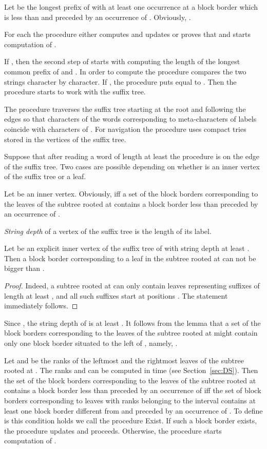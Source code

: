 \documentclass[10pt]{llncs}
\newcommand{\exist}{{\sc Exist}}
\begin{document}
Let  be the longest prefix of  with at least one occurrence at a block border which is less than  and preceded by an occurrence of . Obviously, . 

For each  the procedure  either computes  and updates  or proves that  and starts computation of .

If , then the second step of  starts with computing the length  of the longest common prefix of   and . In order to compute  the procedure compares the two strings character by character. If , the procedure puts  equal to . Then the procedure starts to work with the suffix tree.

The procedure traverses the suffix tree starting at the root and following the edges so that characters of the words corresponding to meta-characters of labels coincide with characters of . For navigation the procedure uses compact tries stored in the vertices of the suffix tree.

Suppose that after reading a word  of length at least  the procedure is on the edge  of the suffix tree. Two cases are possible depending on whether  is an inner vertex of the suffix tree or a leaf.

Let  be an inner vertex. Obviously,  iff a set of the block borders corresponding to the leaves of the subtree rooted at  contains a block border less than  preceded by an occurrence of .

\begin{definition}
  \emph{String depth} of a vertex  of the suffix tree is the length of its label.
\end{definition}

\begin{lemma}
\label{lm:B_v_prop}
 Let  be an explicit inner vertex of the suffix tree of  with string depth at least . Then a block border corresponding to a leaf in the subtree rooted at  can not be bigger than .
\end{lemma}
\begin{proof}
  Indeed, a subtree rooted at  can only contain leaves representing suffixes of length at least , and all such suffixes start at positions . The statement immediately follows.
\end{proof}

Since , the string depth of  is at least . It follows from the lemma that a set of the block borders corresponding to the leaves of the subtree rooted at  might contain only one block border situated to the left of , namely, . 

Let  and  be the ranks of the leftmost and the rightmost leaves of the subtree rooted at . The ranks  and  can be computed in  time (see Section~\ref{sec:DS}). Then the set of the block borders corresponding to the leaves of the subtree rooted at  contains a block border less than  preceded by an occurrence of  iff the set of block borders corresponding to leaves with ranks belonging to the interval  contains at least one block border different from  and preceded by an occurrence of . To define is this condition holds we call the procedure \exist{}. If such a block border exists, the procedure updates  and proceeds. Otherwise, the procedure starts computation of .
\end{document}

